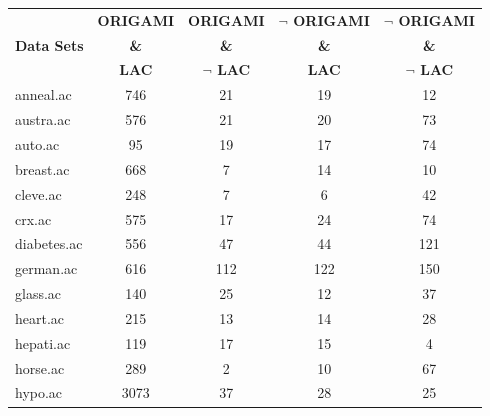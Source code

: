 \begin{table}[htbp]
	\centering
		\begin{tabular}{|l|c|c|c|c|}
		\hline
				& \textbf{ORIGAMI}	& \textbf{ORIGAMI}		& \textbf{$\neg$ ORIGAMI}	& \textbf{$\neg$ ORIGAMI}	\\
		\textbf{Data Sets}	& \textbf{\&}		& \textbf{\&}			& \textbf{\&}			& \textbf{\&}			\\
				&  \textbf{LAC}		& \textbf{$\neg$ LAC}		& \textbf{LAC}			& \textbf{$\neg$ LAC}		\\
		\hline
		anneal.ac       & 746           & 21                 & 19                       & 12                            \\
		\hline
		austra.ac       & 576           & 21                 & 20                       & 73                            \\
		\hline
		auto.ac         & 95            & 19                 & 17                       & 74                            \\
		\hline
		breast.ac       & 668           & 7                  & 14                       & 10                            \\
		\hline
		cleve.ac        & 248           & 7                  & 6                        & 42                            \\
		\hline
		crx.ac          & 575           & 17                 & 24                       & 74                            \\
		\hline
		diabetes.ac     & 556           & 47                 & 44                       & 121                           \\
		\hline
		german.ac       & 616           & 112                & 122                      & 150                           \\
		\hline
		glass.ac        & 140           & 25                 & 12                       & 37                            \\
		\hline
		heart.ac        & 215           & 13                 & 14                       & 28                            \\
		\hline
		hepati.ac       & 119           & 17                 & 15                       & 4                             \\
		\hline
		horse.ac        & 289           & 2                  & 10                       & 67                            \\
		\hline
		hypo.ac         & 3073          & 37                 & 28                       & 25                            \\

\end{tabular}
\end{table}
